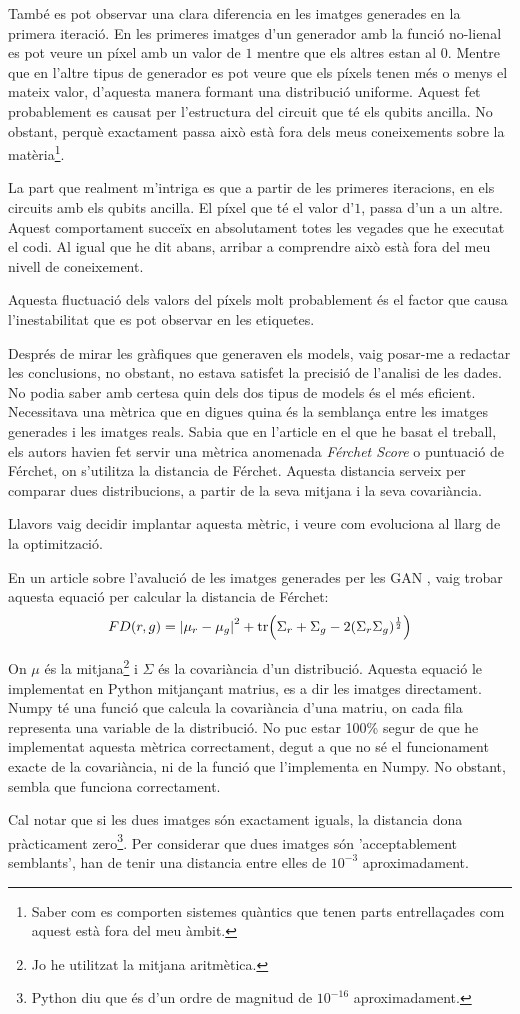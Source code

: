 També es pot observar una clara diferencia en les imatges generades en la primera iteració. En les primeres imatges d'un generador amb la funció no-lienal es pot veure un píxel amb un valor de $1$ mentre que els altres estan al $0$. Mentre que en l'altre tipus de generador es pot veure que els píxels tenen més o menys el mateix valor, d'aquesta manera formant una distribució uniforme. Aquest fet probablement es causat per l'estructura del circuit que té els qubits ancilla. No obstant, perquè exactament passa això està fora dels meus coneixements sobre la matèria\footnote{Saber com es comporten sistemes quàntics que tenen parts entrellaçades com aquest està fora del meu àmbit.}. 

La part que realment m'intriga es que a partir de les primeres iteracions, en els circuits amb els qubits ancilla. El píxel que té el valor d'$1$, passa d'un a un altre. Aquest comportament succeïx en absolutament totes les vegades que he executat el codi. Al igual que he dit abans, arribar a comprendre això està fora del meu nivell de coneixement. 

Aquesta fluctuació dels valors del píxels molt probablement és el factor que causa l'inestabilitat que es pot observar en les etiquetes. 

Després de mirar les gràfiques que generaven els models, vaig posar-me a redactar les conclusions, no obstant, no estava satisfet la precisió de l'analisi de les dades. No podia saber amb certesa quin dels dos tipus de models és el més eficient. Necessitava una mètrica que en digues quina és la semblança entre les imatges generades i les imatges reals. Sabia que en l'article en el que he basat el treball, els autors havien fet servir una mètrica anomenada \textit{Férchet Score} o puntuació de Férchet, on s'utilitza la distancia de Férchet. Aquesta distancia serveix per comparar dues distribucions, a partir de la seva mitjana i la seva covariància. 

Llavors vaig decidir implantar aquesta mètric, i veure com evoluciona al llarg de la optimització. 

En un article sobre l'avalució de les imatges generades per les GAN \cite{sd_score}, vaig trobar aquesta equació per calcular la distancia de Férchet:
$$
FD(r, g) = \abs{\mu_r - \mu_g}^2 + \tr(\Sigma_r + \Sigma_g -2(\Sigma_r\Sigma_g)^{\frac{1}{2}})
$$

On $\mu$ és la mitjana\footnote{Jo he utilitzat la mitjana aritmètica.} i $\Sigma$ és la covariància d'un distribució. Aquesta equació le implementat en Python mitjançant matrius, es a dir les imatges directament. Numpy té una funció que calcula la covariància d'una matriu, on cada fila representa una variable de la distribució. No puc estar 100\% segur de que he implementat aquesta mètrica correctament, degut a que no sé el funcionament exacte de la covariància, ni de la funció que l'implementa en Numpy. No obstant, sembla que funciona correctament. 

Cal notar que si les dues imatges són exactament iguals, la distancia dona pràcticament zero\footnote{Python diu que és d'un ordre de magnitud de $10^{-16}$ aproximadament.}. Per considerar que dues imatges són 'acceptablement semblants', han de tenir una distancia entre elles de $10^{-3}$ aproximadament. 